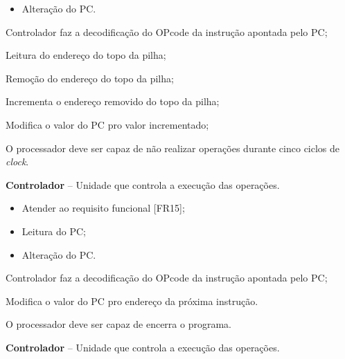 \documentclass{article}
\begin{document}
  \postconditions
  \begin{itemize}
  	\item Alteração do PC.
  \end{itemize}
  
  
  \begin{mainflow}
  	\item Controlador faz a  decodificação do OPcode da instrução apontada pelo PC;
  	\item Leitura do endereço do topo da pilha;
  	\item Remoção do endereço do topo da pilha;
  	\item Incrementa o endereço removido do topo da pilha;
  	\item Modifica o valor do PC pro valor incrementado;
  \end{mainflow}
  
  O processador deve ser capaz de não realizar operações durante cinco ciclos de \textit{clock}.
  \actors
  \begin{description}
  	\item \textbf{Controlador} – Unidade que controla a execução das operações.
  \end{description}
  
  \preconditions 
  \begin{itemize}
  	\item Atender ao requisito funcional [FR15];
  	\item Leitura do PC;
  \end{itemize}
  
  \postconditions
  \begin{itemize}
  	\item Alteração do PC.
  \end{itemize}
  
  
  \begin{mainflow}
  	\item Controlador faz a  decodificação do OPcode da instrução apontada pelo PC;
  	\item Modifica o valor do PC pro endereço da próxima instrução.
  \end{mainflow}
  
  
  O processador deve ser capaz de encerra o programa.
  \actors
  \begin{description}
  	\item \textbf{Controlador} – Unidade que controla a execução das operações.
  \end{description}
  
\end{document}
